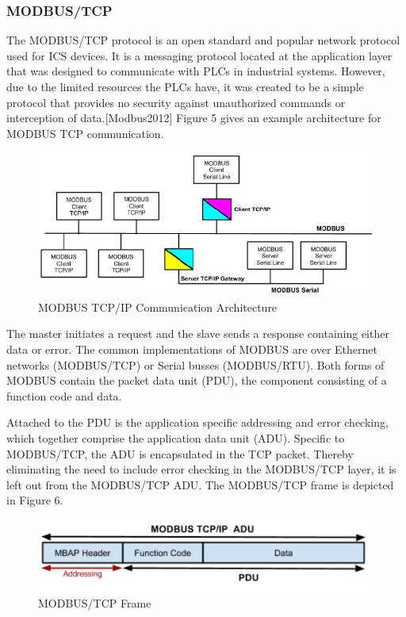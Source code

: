 \documentclass[12pt,]{article}
\begin{document}
\subsubsection{MODBUS/TCP}\label{modbustcp}

The MODBUS/TCP protocol is an open standard and popular network protocol
used for ICS devices. It is a messaging protocol located at the
application layer that was designed to communicate with PLCs in
industrial systems. However, due to the limited resources the PLCs have,
it was created to be a simple protocol that provides no security against
unauthorized commands or interception of data.{[}Modbus2012{]} Figure 5
gives an example architecture for MODBUS TCP communication.

\begin{figure}

{\centering \includegraphics{thesis_files/figure-latex/unnamed-chunk-9-1} 

}

\caption{MODBUS TCP/IP Communication Architecture}\label{fig:unnamed-chunk-9}
\end{figure}

The master initiates a request and the slave sends a response containing
either data or error. The common implementations of MODBUS are over
Ethernet networks (MODBUS/TCP) or Serial busses (MODBUS/RTU). Both forms
of MODBUS contain the packet data unit (PDU), the component consisting
of a function code and data.

Attached to the PDU is the application specific addressing and error
checking, which together comprise the application data unit (ADU).
Specific to MODBUS/TCP, the ADU is encapsulated in the TCP packet.
Thereby eliminating the need to include error checking in the MODBUS/TCP
layer, it is left out from the MODBUS/TCP ADU. The MODBUS/TCP frame is
depicted in Figure 6.

\begin{figure}

{\centering \includegraphics{thesis_files/figure-latex/unnamed-chunk-10-1} 

}

\caption{MODBUS/TCP Frame}\label{fig:unnamed-chunk-10}
\end{figure}
\end{document}
